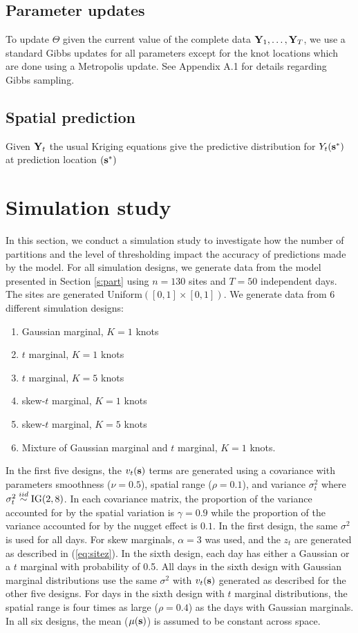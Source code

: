\documentclass[11pt]{article}
\begin{document}
\subsection{Parameter updates}\label{s:params}
To update $\Theta$ given the current value of the complete data $\mbox{\bf Y}_1, \ldots, \mbox{\bf Y}_T$, we use a standard Gibbs updates for all parameters except for the knot locations which are done using a Metropolis update.
See Appendix A.1 for details regarding Gibbs sampling.

\subsection{Spatial prediction}\label{s:pred}
Given $\mbox{\bf Y}_t$ the usual Kriging equations give the predictive distribution for $Y_t(\mbox{\bf s}^*)$ at prediction location $(\mbox{\bf s}^*)$

\section{Simulation study}\label{s:simstudy}
In this section, we conduct a simulation study to investigate how the number of partitions and the level of thresholding impact the accuracy of predictions made by the model.
For all simulation designs, we generate data from the model presented in Section \ref{s:part} using $n=130$ sites and $T=50$ independent days.
The sites are generated Uniform$([0, 1] \times [0, 1])$.
We generate data from 6 different simulation designs:
\begin{enumerate} \setlength{\itemsep}{-0.5em}
  \item Gaussian marginal, $K=1$ knots
  \item $t$ marginal, $K=1$ knots
  \item $t$ marginal, $K=5$ knots
  \item skew-$t$ marginal, $K=1$ knots
  \item skew-$t$ marginal, $K=5$ knots
  \item Mixture of Gaussian marginal and $t$ marginal, $K=1$ knots.
\end{enumerate}
In the first five designs, the $v_t(\mbox{\bf s})$ terms are generated using a \Matern covariance with parameters smoothness ($\nu = 0.5$), spatial range ($\rho = 0.1$), and variance $\sigma^2_t$ where $\sigma^2_t \stackrel{iid}{\sim} \text{IG}(2, 8)$.
In each covariance matrix, the proportion of the variance accounted for by the spatial variation is $\gamma = 0.9$ while the proportion of the variance accounted for by the nugget effect is $0.1$.
In the first design, the same $\sigma^2$ is used for all days.
For skew marginals, $\alpha = 3$ was used, and the $z_t$ are generated as described in (\ref{eq:sitez}).
In the sixth design, each day has either a Gaussian or a $t$ marginal with probability of 0.5.
All days in the sixth design with Gaussian marginal distributions use the same $\sigma^2$ with $v_t(\mbox{\bf s})$ generated as described for the other five designs.
For days in the sixth design with $t$ marginal distributions, the spatial range is four times as large ($\rho = 0.4$) as the days with Gaussian marginals.
In all six designs, the mean ($\mu(\mbox{\bf s})$) is assumed to be constant across space.
\end{document}
